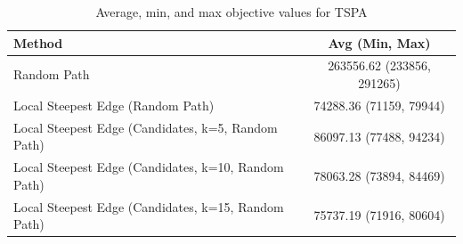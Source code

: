 \begin{table}[h!]
\centering
\begin{tabular}{lc}
\hline
Method & Avg (Min, Max) \\
\hline
Random Path & 263556.62 (233856, 291265) \\
Local Steepest Edge (Random Path) & 74288.36 (71159, 79944) \\
Local Steepest Edge (Candidates, k=5, Random Path) & 86097.13 (77488, 94234) \\
Local Steepest Edge (Candidates, k=10, Random Path) & 78063.28 (73894, 84469) \\
Local Steepest Edge (Candidates, k=15, Random Path) & 75737.19 (71916, 80604) \\
\hline
\end{tabular}
\caption{Average, min, and max objective values for TSPA}
\label{tab:TSPA_scores}
\end{table}
